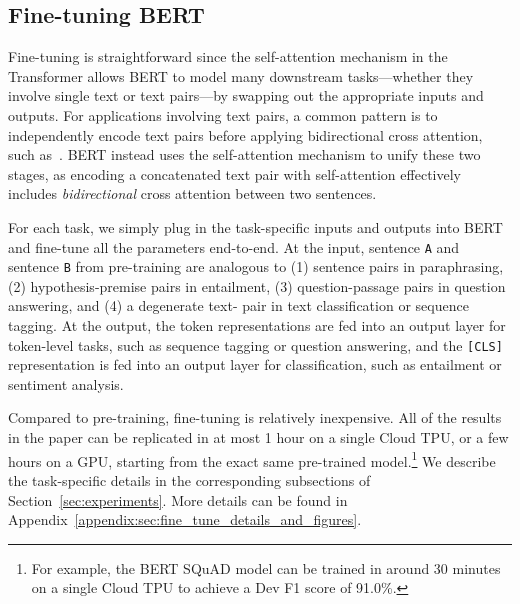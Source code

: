 \documentclass[11pt,a4paper]{article}
\begin{document}
\subsection{Fine-tuning BERT}
\label{sec:finetuning_procedure}

Fine-tuning is straightforward since the self-attention mechanism in the Transformer allows BERT to model many downstream tasks---whether they involve single text or text pairs---by swapping out the appropriate inputs and outputs.
For applications involving text pairs, a common pattern is to independently encode text pairs before applying bidirectional cross attention, such as~. BERT instead uses the self-attention mechanism to unify these two stages, as encoding 
a concatenated text pair with self-attention effectively includes \emph{bidirectional} cross attention between two sentences. 


For each task, we simply plug in the task-specific inputs and outputs into BERT and fine-tune all the parameters end-to-end. 
At the input, sentence {\tt A} and sentence {\tt B} from pre-training are analogous to (1) sentence pairs in paraphrasing, (2) hypothesis-premise pairs in entailment, (3) question-passage pairs in question answering, and (4) a degenerate text- pair in text classification or sequence tagging. At the output, the token representations are fed into an output layer for token-level tasks, such as sequence tagging or question answering, and the {\tt [CLS]} representation is fed into an output layer for classification, such as entailment or sentiment analysis.


Compared to pre-training, fine-tuning is relatively inexpensive. All of the results in the paper can be replicated in at most 1 hour on a single Cloud TPU, or a few hours on a GPU, starting from the exact same pre-trained model.\footnote{For example, the BERT SQuAD model can be trained in around 30 minutes on a single Cloud TPU to achieve a Dev F1 score of 91.0\%.}
We describe the task-specific details in the corresponding subsections of Section~\ref{sec:experiments}. 
More details can be found in Appendix~\ref{appendix:sec:fine_tune_details_and_figures}.
\end{document}
